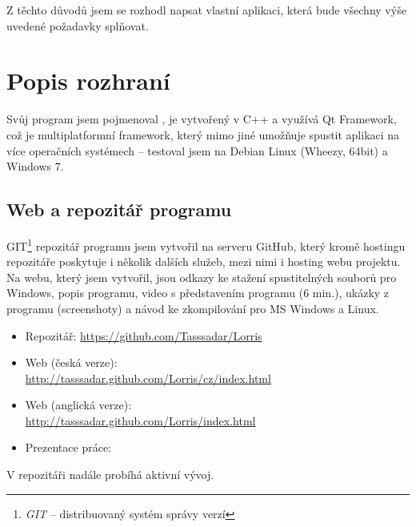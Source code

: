 \documentclass[12pt, a4paper, oneside]{article}
\newcommand{\It}{\textit}  %
\begin{document}
\vspace{5mm}

Z těchto důvodů jsem se rozhodl napsat vlastní aplikaci, která bude všechny výše uvedené požadavky splňovat.

\section{Popis rozhraní}
Svůj program jsem pojmenoval , je vytvořený v C++ a využívá Qt Framework\cite{qtfrm}, což je multiplatformní framework, který mimo jiné umožňuje spustit aplikaci na více operačních systémech -- testoval jsem na Debian Linux\cite{debian} (Wheezy, 64bit) a Windows 7.

\subsection{Web a repozitář programu}
GIT\footnote{\It{GIT} -- distribuovaný systém správy verzí} repozitář programu jsem vytvořil na serveru GitHub\cite{github}, který kromě hostingu repozitáře poskytuje i několik dalších služeb, mezi nimi i hosting webu projektu. Na webu, který jsem vytvořil, jsou odkazy ke stažení spustitelných souborů pro Windows, popis programu, video s představením programu (6 min.), ukázky z programu (screenshoty) a návod ke zkompilování pro MS Windows a Linux.

\begin{itemize}
    \item Repozitář: \url{https://github.com/Tasssadar/Lorris}
    \item Web (česká verze):\\ \url{http://tasssadar.github.com/Lorris/cz/index.html}
    \item Web (anglická verze):\\ \url{http://tasssadar.github.com/Lorris/index.html}
    \item Prezentace práce: \\ 
\end{itemize}
V repozitáři nadále probíhá aktivní vývoj.
\end{document}
